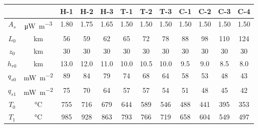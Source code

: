 \begin{tabular}{cccccccccccc}
\toprule
& & H-1 & H-2 & H-3 & T-1 & T-2 & T-3 & C-1 & C-2 & C-3 & C-4 \\
\midrule
$A_{s}$ & \si{\uW\per\m\cubed} & 1.80 & 1.75 & 1.65 & 1.50 & 1.50 & 1.50 & 1.50 & 1.50 & 1.50 & 1.50 \\
$L_{0}$ & \si{\km} & 56 & 59 & 62 & 65 & 72 & 78 & 88 & 98 & 110 & 124 \\
$z_{0}$ & \si{\km} & 30 & 30 & 30 & 30 & 30 & 30 & 30 & 30 & 30 & 30 \\
$h_{r0}$ & \si{\km} & 13.0 & 12.0 & 11.0 & 10.0 & 10.5 & 10.0 & 9.5 & 9.0 & 8.5 & 8.0 \\
\midrule
$q_{s0}$ & \si{\mW\per\m\squared} & 89 & 84 & 79 & 74 & 68 & 64 & 58 & 53 & 48 & 43 \\
$q_{s1}$ & \si{\mW\per\m\squared} & 75 & 70 & 64 & 57 & 57 & 54 & 51 & 48 & 45 & 42 \\
$T_{0}$ & \si{\degreeCelsius} & 755 & 716 & 679 & 644 & 589 & 546 & 488 & 441 & 395 & 353 \\
$T_{1}$ & \si{\degreeCelsius} & 985 & 928 & 863 & 793 & 766 & 719 & 658 & 604 & 549 & 497 \\
\bottomrule
\end{tabular}
